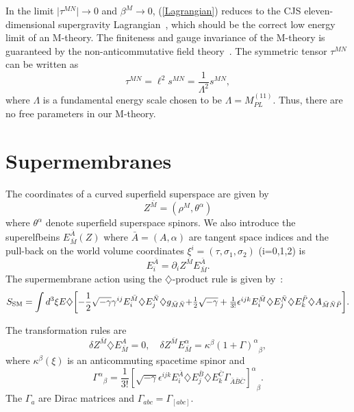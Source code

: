 \documentclass[a4paper,12pt]{article}
\begin{document}
In the limit $\vert\tau^{MN}\vert\rightarrow 0$ and
$\beta^M\rightarrow 0$, (\ref{Lagrangian}) reduces to the
CJS eleven-dimensional supergravity Lagrangian~\cite{Julia},
which should be the correct low energy limit of an M-theory. The finiteness
and gauge invariance of the M-theory is guaranteed by the
non-anticommutative field theory~\cite{Moffat3,Moffat4,Moffat5}.
The symmetric tensor $\tau^{MN}$ can be written as
\begin{equation}
\tau^{MN}=\ell^2s^{MN}=\frac{1}{\Lambda^2}s^{MN},
\end{equation}
where $\Lambda$ is a fundamental energy scale chosen to be
$\Lambda=M^{(11)}_{PL}$. Thus, there are no free parameters in
our M-theory.

\section{\bf Supermembranes}

The coordinates of a curved superfield
superspace are given by
\begin{equation}
Z^{\bar M}=(\rho^M,\theta^\alpha)
\end{equation}
where $\theta^\alpha$ denote superfield superspace spinors. We
also introduce the superelfbeins $E_{\bar M}^{\bar A}(Z)$ where
${\bar A}=(A,\alpha)$ are tangent space indices and the pull-back
on the world volume coordinates $\xi^i=(\tau,\sigma_1,\sigma_2)$
(i=0,1,2) is
\begin{equation}
E_i^{\bar A}=\partial_iZ^{\bar M}E_{\bar M}^{\bar A}.
\end{equation}
The supermembrane action using the
$\diamondsuit$-product rule
is given by~\cite{Townsend,Duff}:
\begin{equation}
S_{\rm SM}=\int d^{3}\xi
E\diamondsuit\biggl[-\frac{1}{2}\sqrt{-\gamma}
\gamma^{ij}E_i^{\bar M}\diamondsuit E_j^{\bar
N}\diamondsuit g_{\bar M\bar N}
$$ $$
+\frac{1}{2}\sqrt{-\gamma}
+\frac{1}{3!}\epsilon^{ijk}E_i^{\bar M}\diamondsuit
E_j^{\bar N}\diamondsuit E_k^{\bar P}\diamondsuit A_{\bar M\bar
N\bar P}\biggr]. \end{equation}

The transformation rules are
\begin{equation}
\delta Z^{\bar M}\diamondsuit E^A_{\bar M}=0,\quad \delta
Z^{\bar M}E^\alpha_{\bar
M}={\kappa^\beta(1+\Gamma)^\alpha}_\beta,
\end{equation}
where
$\kappa^\beta(\xi)$ is an anticommuting spacetime spinor and
\begin{equation}
{\Gamma^\alpha}_\beta=\frac{1}{3!}{[\sqrt{-\gamma}\epsilon^{ijk}E_i^{\bar
A}\diamondsuit E_j^{\bar B}\diamondsuit E_k^{\bar C}\Gamma_{\bar
A\bar B\bar C}]^\alpha}_\beta.
\end{equation}
The $\Gamma _a$
are Dirac matrices and $\Gamma_{abc}=\Gamma_{[abc]}$.
\end{document}
